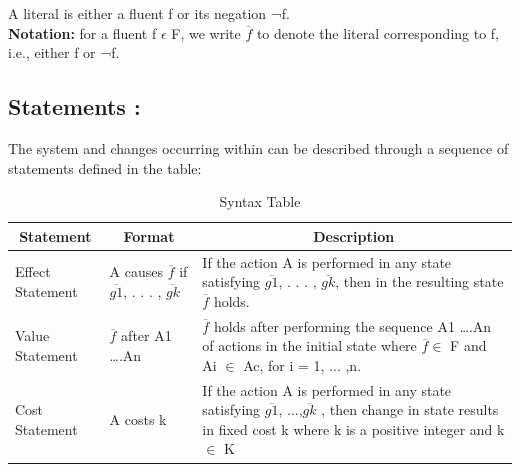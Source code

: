 \documentclass[11pt]{article}
\begin{document}
A literal is either a fluent f or its negation ¬f.\\
\textbf{Notation:} for a fluent f $\epsilon$ F, we write $\overline{f}$ to denote the literal corresponding to f, i.e., either f or ¬f.
\subsection{Statements :}\label{sec:Statements} 
	The system and changes occurring within can be described through a sequence of statements defined in the table:
	\begin{table}[H]
  \centering
    \begin{tabular}{|p{2cm}|p{4cm}|p{9cm}|}
    \hline
    \multicolumn{1}{|c|}{\textbf{Statement}} & \multicolumn{1}{c|}{\textbf{Format}} & \multicolumn{1}{c|}{\textbf{Description}} \\
    \hline
    Effect Statement & A causes $\overline{f}$ if $\overline{g1}$, . . . , $\overline{gk}$ & If the action A is performed in any state satisfying $\overline{g1}$, . . . , $\overline{gk}$, then in
    the resulting state $\overline{f}$ holds. \\
    \hline
    Value Statement & $\overline{f}$ after A1 ….An & $\overline{f}$ holds after performing the sequence A1 ….An of actions in the initial state where $\overline{f} \in$ F and Ai $\in$ Ac, for i = 1, ... ,n. \\
    \hline
    Cost Statement & A costs k & If the action A is performed in any state satisfying $\overline{g1}$, ...,$\overline{gk}$ , then change in state results in fixed cost k where k is a positive integer and k $\in$ K \\
    \hline
    \end{tabular}
    \caption{Syntax Table}
  \label{tab:table01}
\end{table}
\end{document}
